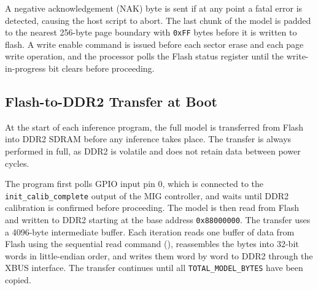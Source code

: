 A negative acknowledgement (NAK) byte is sent if at any point a fatal error is detected, causing the host script to abort. The last chunk of the model is padded to the nearest 256-byte page boundary with \texttt{0xFF} bytes before it is written to flash. A write enable command is issued before each sector erase and each page write operation, and the processor polls the Flash status register until the write-in-progress bit clears before proceeding.

\subsection{Flash-to-DDR2 Transfer at Boot}
\label{sec:flash_to_ddr2}

At the start of each inference program, the full model is transferred from Flash into DDR2 SDRAM before any inference takes place. The transfer is always performed in full, as DDR2 is volatile and does not retain data between power cycles.

The program first polls GPIO input pin 0, which is connected to the \texttt{init\_calib\_complete} output of the MIG controller, and waits until DDR2 calibration is confirmed before proceeding. The model is then read from Flash and written to DDR2 starting at the base address \texttt{0x88000000}. The transfer uses a 4096-byte intermediate buffer. Each iteration reads one buffer of data from Flash using the sequential read command (\cite{infineon_s25fl127s}), reassembles the bytes into 32-bit words in little-endian order, and writes them word by word to DDR2 through the XBUS interface. The transfer continues until all \texttt{TOTAL\_MODEL\_BYTES} have been copied.
